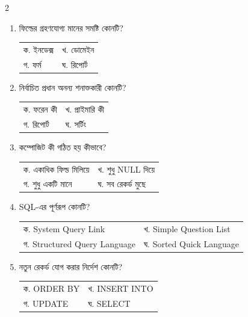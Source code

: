 \begin{multicols}{2}
\begin{enumerate}
\item \begin{minipage}[t]{\linewidth}
ফিল্ডের গ্রহণযোগ্য মানের সমষ্টি কোনটি?
\par
\begin{tabularx}{\linewidth}{@{}X X@{}}
ক. ইনডেক্স & খ. ডোমেইন \\
গ. ফর্ম & ঘ. রিপোর্ট \\
\end{tabularx}
\end{minipage}
\vspace{1pt}

\item \begin{minipage}[t]{\linewidth}
নির্বাচিত প্রধান অনন্য শনাক্তকারী কোনটি?
\par
\begin{tabularx}{\linewidth}{@{}X X@{}}
ক. ফরেন কী & খ. প্রাইমারি কী \\
গ. রিপোর্ট & ঘ. সর্টিং \\
\end{tabularx}
\end{minipage}
\vspace{1pt}

\item \begin{minipage}[t]{\linewidth}
কম্পোজিট কী গঠিত হয় কীভাবে?
\par
\begin{tabularx}{\linewidth}{@{}X X@{}}
ক. একাধিক ফিল্ড মিলিয়ে & খ. শুধু NULL দিয়ে \\
গ. শুধু একটি মানে & ঘ. সব রেকর্ড মুছে \\
\end{tabularx}
\end{minipage}
\vspace{1pt}

\item \begin{minipage}[t]{\linewidth}
SQL-এর পূর্ণরূপ কোনটি?
\par
\begin{tabularx}{\linewidth}{@{}X X@{}}
ক. System Query Link & খ. Simple Question List \\
গ. Structured Query Language & ঘ. Sorted Quick Language \\
\end{tabularx}
\end{minipage}
\vspace{1pt}

\item \begin{minipage}[t]{\linewidth}
নতুন রেকর্ড যোগ করার নির্দেশ কোনটি?
\par
\begin{tabularx}{\linewidth}{@{}X X@{}}
ক. ORDER BY & খ. INSERT INTO \\
গ. UPDATE & ঘ. SELECT \\
\end{tabularx}
\end{minipage}
\vspace{1pt}


\end{enumerate}
\end{multicols}
